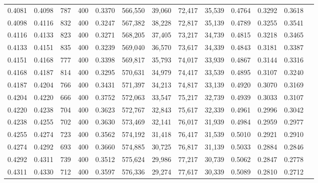 \begin{tabular}{rrrrrrrrrrrrr}
0.4081 & 0.4098 &    787 &   400 &                                     0.3370 & 566,550 &  39,060 &  72,417 &  35,539 & 0.4764 & 0.3292 & 0.3618 \\
0.4098 & 0.4116 &    832 &   400 &                                     0.3247 & 567,382 &  38,228 &  72,817 &  35,139 & 0.4789 & 0.3255 & 0.3541 \\
0.4116 & 0.4133 &    823 &   400 &                                     0.3271 & 568,205 &  37,405 &  73,217 &  34,739 & 0.4815 & 0.3218 & 0.3465 \\
0.4133 & 0.4151 &    835 &   400 &                                     0.3239 & 569,040 &  36,570 &  73,617 &  34,339 & 0.4843 & 0.3181 & 0.3387 \\
0.4151 & 0.4168 &    777 &   400 &                                     0.3398 & 569,817 &  35,793 &  74,017 &  33,939 & 0.4867 & 0.3144 & 0.3316 \\
0.4168 & 0.4187 &    814 &   400 &                                     0.3295 & 570,631 &  34,979 &  74,417 &  33,539 & 0.4895 & 0.3107 & 0.3240 \\
0.4187 & 0.4204 &    766 &   400 &                                     0.3431 & 571,397 &  34,213 &  74,817 &  33,139 & 0.4920 & 0.3070 & 0.3169 \\
0.4204 & 0.4220 &    666 &   400 &                                     0.3752 & 572,063 &  33,547 &  75,217 &  32,739 & 0.4939 & 0.3033 & 0.3107 \\
0.4220 & 0.4238 &    704 &   400 &                                     0.3623 & 572,767 &  32,843 &  75,617 &  32,339 & 0.4961 & 0.2996 & 0.3042 \\
0.4238 & 0.4255 &    702 &   400 &                                     0.3630 & 573,469 &  32,141 &  76,017 &  31,939 & 0.4984 & 0.2959 & 0.2977 \\
0.4255 & 0.4274 &    723 &   400 &                                     0.3562 & 574,192 &  31,418 &  76,417 &  31,539 & 0.5010 & 0.2921 & 0.2910 \\
0.4274 & 0.4292 &    693 &   400 &                                     0.3660 & 574,885 &  30,725 &  76,817 &  31,139 & 0.5033 & 0.2884 & 0.2846 \\
0.4292 & 0.4311 &    739 &   400 &                                     0.3512 & 575,624 &  29,986 &  77,217 &  30,739 & 0.5062 & 0.2847 & 0.2778 \\
0.4311 & 0.4330 &    712 &   400 &                                     0.3597 & 576,336 &  29,274 &  77,617 &  30,339 & 0.5089 & 0.2810 & 0.2712 \\

\end{tabular}

